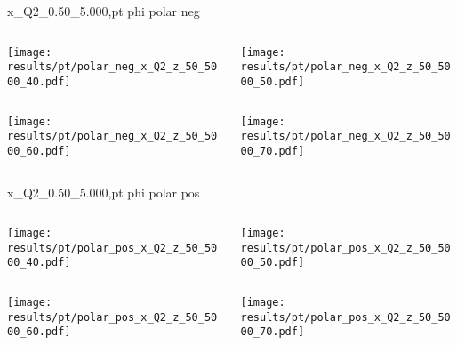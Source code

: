 \begin{frame}{x\_Q2\_0.50\_5.000,pt phi polar neg}
\begin{columns}
\begin{column}[T]{0.5\textwidth}
\texttt{[image: results/pt/polar\_neg\_x\_Q2\_z\_50\_5000\_40.pdf]}
\end{column}
\begin{column}[T]{0.5\textwidth}
\texttt{[image: results/pt/polar\_neg\_x\_Q2\_z\_50\_5000\_50.pdf]}
\end{column}
\end{columns}
\begin{columns}
\begin{column}[T]{0.5\textwidth}
\texttt{[image: results/pt/polar\_neg\_x\_Q2\_z\_50\_5000\_60.pdf]}
\end{column}
\begin{column}[T]{0.5\textwidth}
\texttt{[image: results/pt/polar\_neg\_x\_Q2\_z\_50\_5000\_70.pdf]}
\end{column}
\end{columns}
\end{frame}
\begin{frame}{x\_Q2\_0.50\_5.000,pt phi polar pos}
\begin{columns}
\begin{column}[T]{0.5\textwidth}
\texttt{[image: results/pt/polar\_pos\_x\_Q2\_z\_50\_5000\_40.pdf]}
\end{column}
\begin{column}[T]{0.5\textwidth}
\texttt{[image: results/pt/polar\_pos\_x\_Q2\_z\_50\_5000\_50.pdf]}
\end{column}
\end{columns}
\begin{columns}
\begin{column}[T]{0.5\textwidth}
\texttt{[image: results/pt/polar\_pos\_x\_Q2\_z\_50\_5000\_60.pdf]}
\end{column}
\begin{column}[T]{0.5\textwidth}
\texttt{[image: results/pt/polar\_pos\_x\_Q2\_z\_50\_5000\_70.pdf]}
\end{column}
\end{columns}
\end{frame}
